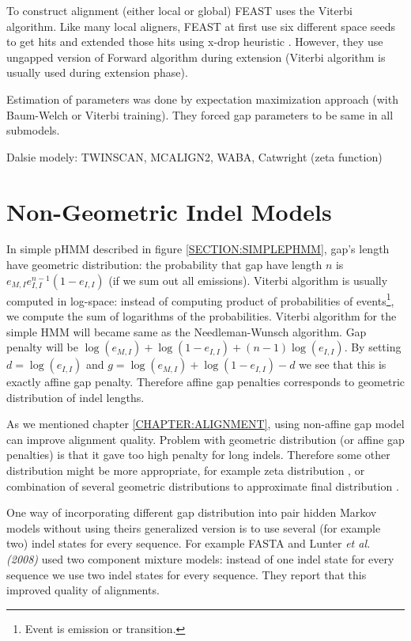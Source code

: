 To construct alignment (either local or global) FEAST uses the Viterbi
algorithm. Like many local aligners, FEAST at first use six different space
seeds to get hits and extended those hits using x-drop heuristic \cite{}.
However, they use ungapped version of Forward algorithm during extension
(Viterbi algorithm is usually used during extension phase).

Estimation of parameters was done by expectation maximization approach (with
Baum-Welch or Viterbi training). They forced gap parameters to be same in all
submodels.


Dalsie modely: TWINSCAN, MCALIGN2, WABA, Catwright (zeta function)

\section{Non-Geometric Indel Models}
In simple pHMM described in figure \ref{SECTION:SIMPLEPHMM}, gap's length have
geometric distribution: the probability that gap have length $n$ is
$e_{M,I}e_{I,I}^{n-1}(1-e_{I,I})$ (if we sum out all emissions).  Viterbi
algorithm is usually computed in log-space: instead of computing product of
probabilities of events\footnote{Event is emission or transition.}, we compute
the sum of logarithms of the probabilities. Viterbi algorithm for the simple HMM
will became same as the Needleman-Wunsch algorithm.  Gap penalty will be
$\log(e_{M,I})+\log(1-e_{I,I})+(n-1)\log(e_{I,I})$. By setting $d=\log(e_{I,I})$
and $g=\log(e_{M,I})+\log(1-e_{I,I})-d$ we see that this is exactly affine gap
penalty. Therefore affine gap penalties corresponds to geometric distribution of
indel lengths.

As we mentioned chapter \ref{CHAPTER:ALIGNMENT}, using non-affine gap model can
improve alignment quality.  Problem with geometric distribution (or affine gap
penalties) is
that it gave too high penalty for long indels. Therefore some other distribution
might be more appropriate, for example zeta distribution \cite{}, or combination
of several geometric distributions to approximate final distribution \cite{}.

One way of incorporating different gap distribution into pair hidden Markov
models without using theirs generalized version is to use several (for example
two) indel states for every sequence. For example FASTA \cite{} and Lunter {\it
et al. (2008)} used two component mixture models: instead of one indel state for
every sequence we use two indel states for every sequence. They report that
this improved quality of alignments.

